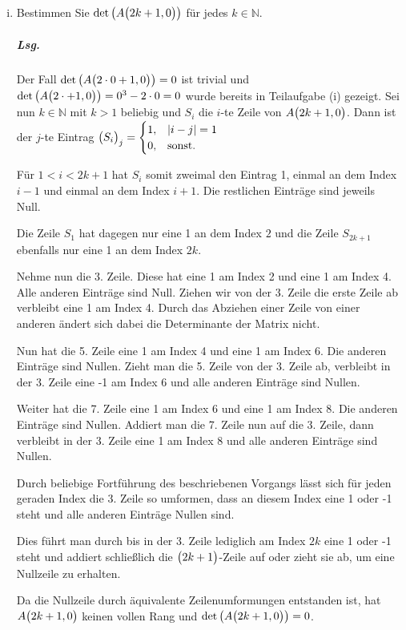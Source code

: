 \documentclass{scrreprt}
\begin{document}
\begin{enumerate}[(a)]
\begin{enumerate}[(i)]
  \item Bestimmen Sie $\det\qty(A\qty\big(2k + 1, 0))$ für jedes
    $k \in \mathbb{N}$.

    \subparagraph{Lsg.} Der Fall $\det\qty(A\qty\big(2 \cdot 0 + 1, 0)) = 0$
    ist trivial und $\det\qty(A\qty\big(2 \cdot  + 1, 0))= 0^3 - 2 \cdot 0 = 0$
    wurde bereits in Teilaufgabe (i) gezeigt.
    Sei nun $k \in \mathbb{N}$ mit $k > 1$ beliebig und $S_i$ die $i$-te Zeile
    von $A\qty\big(2k + 1, 0)$.
    Dann ist der $j$-te Eintrag $\qty\big(S_i)_j = \begin{cases}
      1,       & \abs{i - j} = 1 \\
      0,       & \text{sonst.}
    \end{cases}$

    Für $1 < i < 2k + 1$ hat $S_i$ somit zweimal den Eintrag 1, einmal an dem
    Index $i - 1$ und einmal an dem Index $i + 1$.
    Die restlichen Einträge sind jeweils Null.

    Die Zeile $S_1$ hat dagegen nur eine 1 an dem Index $2$ und die Zeile
    $S_{2k + 1}$ ebenfalls nur eine 1 an dem Index $2k$.

    \newpage
    Nehme nun die 3. Zeile.
    Diese hat eine 1 am Index 2 und eine 1 am Index 4.
    Alle anderen Einträge sind Null.
    Ziehen wir von der 3. Zeile die erste Zeile ab verbleibt eine 1 am Index 4.
    Durch das Abziehen einer Zeile von einer anderen ändert sich dabei die
    Determinante der Matrix nicht.

    Nun hat die 5. Zeile eine 1 am Index 4 und eine 1 am Index 6.
    Die anderen Einträge sind Nullen.
    Zieht man die 5. Zeile von der 3. Zeile ab, verbleibt in der 3. Zeile eine
    -1 am Index 6 und alle anderen Einträge sind Nullen.

    Weiter hat die 7. Zeile eine 1 am Index 6 und eine 1 am Index 8.
    Die anderen Einträge sind Nullen.
    Addiert man die 7. Zeile nun auf die 3. Zeile, dann verbleibt in der 3. Zeile
    eine 1 am Index 8 und alle anderen Einträge sind Nullen.

    Durch beliebige Fortführung des beschriebenen Vorgangs lässt sich für jeden
    geraden Index die 3. Zeile so umformen, dass an diesem Index eine 1 oder -1
    steht und alle anderen Einträge Nullen sind.

    Dies führt man durch bis in der 3. Zeile lediglich am Index $2k$ eine 1 oder
    -1 steht und addiert schließlich die $\qty\big(2k + 1)$-Zeile auf oder zieht
    sie ab, um eine Nullzeile zu erhalten.

    Da die Nullzeile durch äquivalente Zeilenumformungen entstanden ist, hat
    $A\qty\big(2k + 1, 0)$ keinen vollen Rang und
    $\det\qty(A\qty\big(2k + 1, 0)) = 0$.
  \end{enumerate}
\end{enumerate}
\end{document}
